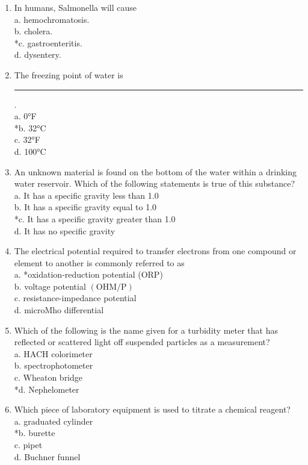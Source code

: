 \begin{enumerate}[1.]
  \item In humans, Salmonella will cause\\
a. hemochromatosis.\\
b. cholera.\\
*c. gastroenteritis.\\
d. dysentery.\\

\item The freezing point of water is \rule{1.5cm}{0.5pt}.\\
a.	0°F\\
*b.	32°C\\
c.	32°F\\
d.	100°C\\

\item An unknown material is found on the bottom of the water within a drinking water reservoir. Which of the following statements is true of this substance?\\
a.	It has a specific gravity less than 1.0\\
b.	It has a specific gravity equal to 1.0\\
*c.	It has a specific gravity greater than 1.0\\
d.	It has no specific gravity\\

 \item The electrical potential required to transfer electrons from one compound or element to another is commonly referred to as\\
a. *oxidation-reduction potential (ORP)\\
b. voltage potential $(\mathrm{OHM} / \mathrm{P})$\\
c. resistance-impedance potential\\
d. microMho differential 

  \item Which of the following is the name given for a turbidity meter that has reflected or scattered light off suspended particles as a measurement?\\
a. HACH colorimeter\\
b. spectrophotometer\\
c. Wheaton bridge\\
*d. Nephelometer\\

  \item Which piece of laboratory equipment is used to titrate a chemical reagent?\\
a. graduated cylinder\\
*b. burette\\
c. pipet\\
d. Buchner funnel\\


\end{enumerate}
